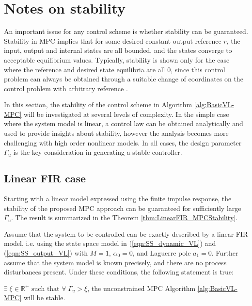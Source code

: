 \section{Notes on stability}

An important issue for any control scheme is whether stability can be guaranteed. Stability in MPC implies that for some desired constant output reference $r$, the input, output and internal states are all bounded, and the states converge to acceptable equilibrium values. Typically, stability is shown only for the case where the reference and desired state equilibria are all 0, since this control problem can always be obtained through a suitable change of coordinates on the control problem with arbitrary reference \cite{Mayne2000}.  

In this section, the stability of the control scheme in Algorithm \ref{alg:BasicVL-MPC} will be investigated at several levels of complexity. In the simple case where the system model is linear, a control law can be obtained analytically and used to provide insights about stability, however the analysis becomes more challenging with high order nonlinear models. In all cases, the design parameter $\Gamma_u$ is the key consideration in generating a stable controller.

\subsection{Linear FIR case}

Starting with a linear model expressed using the finite impulse response, the stability of the proposed MPC approach can be guaranteed for sufficiently large $\Gamma_u$. The result is summarized in the Theorem \ref{thm:LinearFIR_MPCStability}.

\begin{thm}
Assume that the system to be controlled can be exactly described by a linear FIR model, i.e. using the state space model in (\ref{eqn:SS_dynamic_VL}) and (\ref{eqn:SS_output_VL}) with $M=1$, $\alpha_0 = 0$, and Laguerre pole $a_1 = 0$. Further assume that the system model is known precisely, and there are no process disturbances present. Under these conditions, the following statement is true:

$\exists \; \xi \in \mathbb{R}^+ \textrm{ such that } \forall \; \Gamma_u > \xi$, the unconstrained MPC Algorithm \ref{alg:BasicVL-MPC} will be stable.

\label{thm:LinearFIR_MPCStability}
\end{thm}

